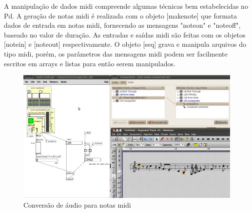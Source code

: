 \documentclass{ppgmus}
\begin{document}
% 
% 
% 
% 
% 
% 
% 
% 



A manipulação de dados midi compreende algumas técnicas bem estabelecidas
no Pd. A geração de notas midi é realizada com o objeto [makenote] que formata
dados de entrada em notas midi, fornecendo as mensagens "noteon" e "noteoff", baseado
no valor de duração. As entradas e saídas midi são feitas com os objetos
[notein] e [noteout] respectivamente. O objeto [seq] grava e manipula arquivos 
do tipo midi, porém, os parâmetros das mensagens midi podem ser facilmente escritos
em arrays e listas para então serem manipulados.

\begin{figure}
\includegraphics[scale=.37]{audio2midi}
\caption{Conversão de áudio para notas midi}
\label{audio2midi}
\end{figure}
\end{document}
